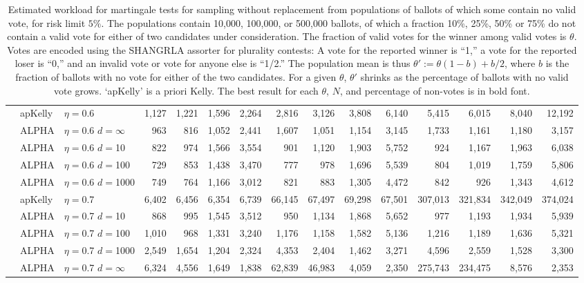 \documentclass[12pt,runningheads]{llncs}
\begin{document}
{\begin{table}
\begin{tabular}{lll|rrrr|rrrr|rrrr}
\cline{2-15} & apKelly & $\eta=$0.6 & 1,127  & 1,221  & 1,596  & 2,264  & 2,816  & 3,126  & 3,808  & 6,140  & 5,415  & 6,015  & 8,040  & 12,192  \\
 & ALPHA & $\eta=$0.6 $d=\infty$ & 963  & 816  & 1,052  & 2,441  & 1,607  & 1,051  & 1,154  & 3,145  & 1,733  & 1,161  & 1,180  & 3,157  \\
& ALPHA & $\eta=$0.6 $d=$10 & 822  & 974  & 1,566  & 3,554  & 901  & 1,120  & 1,903  & 5,752  & 924  & 1,167  & 1,963  & 6,038  \\
& ALPHA & $\eta=$0.6 $d=$100 & 729  & 853  & 1,438  & 3,470  & 777  & 978  & 1,696  & 5,539  & 804  & 1,019  & 1,759  & 5,806  \\
& ALPHA & $\eta=$0.6 $d=$1000 & 749  & 764  & 1,166  & 3,012  & 821  & 883  & 1,305  & 4,472  & 842  & 926  & 1,343  & 4,612  \\
\cline{2-15} & apKelly & $\eta=$0.7 & 6,402  & 6,456  & 6,354  & 6,739  & 66,145  & 67,497  & 69,298  & 67,501  & 307,013  & 321,834  & 342,049  & 374,024  \\
& ALPHA & $\eta=$0.7 $d=$10 & 868  & 995  & 1,545  & 3,512  & 950  & 1,134  & 1,868  & 5,652  & 977  & 1,193  & 1,934  & 5,939  \\
& ALPHA & $\eta=$0.7 $d=$100 & 1,010  & 968  & 1,331  & 3,240  & 1,176  & 1,158  & 1,582  & 5,136  & 1,216  & 1,189  & 1,636  & 5,321  \\
& ALPHA & $\eta=$0.7 $d=$1000 & 2,549  & 1,654  & 1,204  & 2,324  & 4,353  & 2,404  & 1,462  & 3,271  & 4,596  & 2,559  & 1,528  & 3,300  \\
 & ALPHA & $\eta=$0.7 $d=\infty$ & 6,324  & 4,556  & 1,649  & 1,838  & 62,839  & 46,983  & 4,059  & 2,350  & 275,743  & 234,475  & 8,576  & 2,353 
\end{tabular}
 \caption{\protect \label{tab:without-replacement-blanks-1}
Estimated workload for martingale tests for sampling without replacement from populations of ballots of which
some contain no valid vote, for risk limit $5\%$.
The populations contain 10,000, 100,000, or 500,000 ballots, of which a fraction 10\%, 25\%, 50\% or 75\% do not
contain a valid vote for either of two candidates under consideration.
The fraction of valid votes for the winner among valid votes is $\theta$. 
Votes are encoded using the SHANGRLA assorter for plurality contests:
A vote for the reported winner is ``1,'' a vote for the reported loser is ``0,'' and an invalid vote or vote for anyone else is ``1/2.''
The population mean is thus $\theta' := \theta(1-b) + b/2$, where $b$ is the fraction of ballots with no
vote for either of the two candidates.
For a given $\theta$, $\theta'$ shrinks as the percentage of ballots with no valid vote grows.
`apKelly' is a priori Kelly.
The best result for each $\theta$, $N$, and percentage of non-votes is in bold font.
}
\end{table}

}
\end{document}
